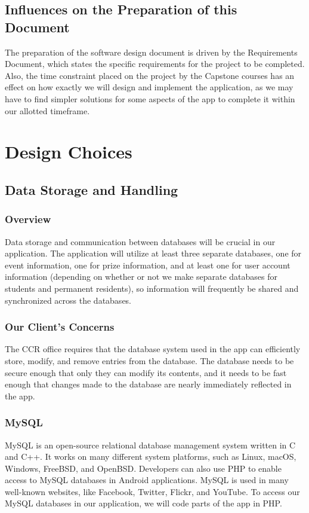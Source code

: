\documentclass[draftclsnofoot, onecolumn, 10pt, compsoc]{IEEEtran}
\begin{document}
		\subsection{Influences on the Preparation of this Document}
			The preparation of the software design document is driven by the Requirements Document, which states the specific requirements for the project to be completed. Also, the time constraint placed on the project by the Capstone courses has an effect on how exactly we will design and implement the application, as we may have to find simpler solutions for some aspects of the app to complete it within our allotted timeframe.
	
	\section{Design Choices}
		\subsection{Data Storage and Handling}
			\subsubsection{Overview}
				Data storage and communication between databases will be crucial in our application. The application will utilize at least three separate databases, one for event information, one for prize information, and at least one for user account information (depending on whether or not we make separate databases for students and permanent residents), so information will frequently be shared and synchronized across the databases.
			\subsubsection{Our Client's Concerns}
				The CCR office requires that the database system used in the app can efficiently store, modify, and remove entries from the database. The database needs to be secure enough that only they can modify its contents, and it needs to be fast enough that changes made to the database are nearly immediately reflected in the app.
			\subsubsection{MySQL}
				MySQL is an open-source relational database management system written in C and C++. It works on many different system platforms, such as Linux, macOS, Windows, FreeBSD, and OpenBSD. Developers can also use PHP to enable access to MySQL databases in Android applications. MySQL is used in many well-known websites, like Facebook, Twitter, Flickr, and YouTube. To access our MySQL databases in our application, we will code parts of the app in PHP.
				~\cite{MySQL}
\end{document}
